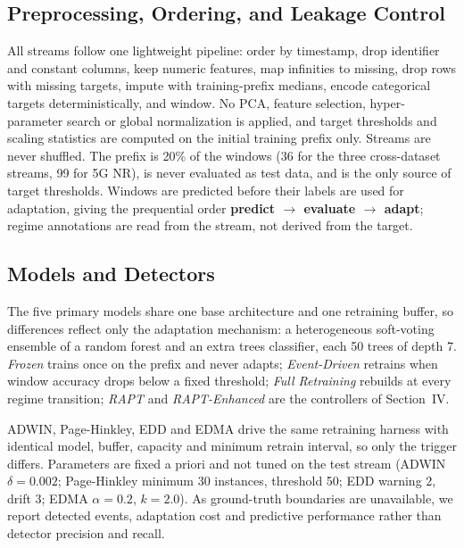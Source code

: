 \documentclass[conference]{IEEEtran}
\begin{document}
\subsection{Preprocessing, Ordering, and Leakage Control}
All streams follow one lightweight pipeline: order by timestamp, drop identifier and
constant columns, keep numeric features, map infinities to missing, drop rows with
missing targets, impute with training-prefix medians, encode categorical targets
deterministically, and window. No PCA, feature selection, hyper-parameter search or
global normalization is applied, and target thresholds and scaling statistics are
computed on the initial training prefix only. Streams are never shuffled. The prefix
is 20\% of the windows (36 for the three cross-dataset streams, 99 for 5G NR), is
never evaluated as test data, and is the only source of target thresholds. Windows
are predicted before their labels are used for adaptation, giving the prequential
order \textbf{predict $\rightarrow$ evaluate $\rightarrow$ adapt}; regime annotations
are read from the stream, not derived from the target.

\subsection{Models and Detectors}
The five primary models share one base architecture and one retraining buffer, so
differences reflect only the adaptation mechanism: a heterogeneous soft-voting
ensemble of a random forest and an extra trees classifier, each 50 trees of depth 7. \emph{Frozen} trains once on the prefix and never
adapts; \emph{Event-Driven} retrains when window accuracy drops below a fixed
threshold; \emph{Full Retraining} rebuilds at every regime transition; \emph{RAPT}
and \emph{RAPT-Enhanced} are the controllers of Section~IV.

ADWIN, Page-Hinkley, EDD and EDMA drive the same retraining harness with identical
model, buffer, capacity and minimum retrain interval, so only the trigger differs.
Parameters are fixed a priori and not tuned on the test stream (ADWIN
$\delta=0.002$; Page-Hinkley minimum 30 instances, threshold 50; EDD warning 2, drift
3; EDMA $\alpha=0.2$, $k=2.0$). As ground-truth boundaries are unavailable, we report
detected events, adaptation cost and predictive performance rather than detector
precision and recall.
\end{document}
